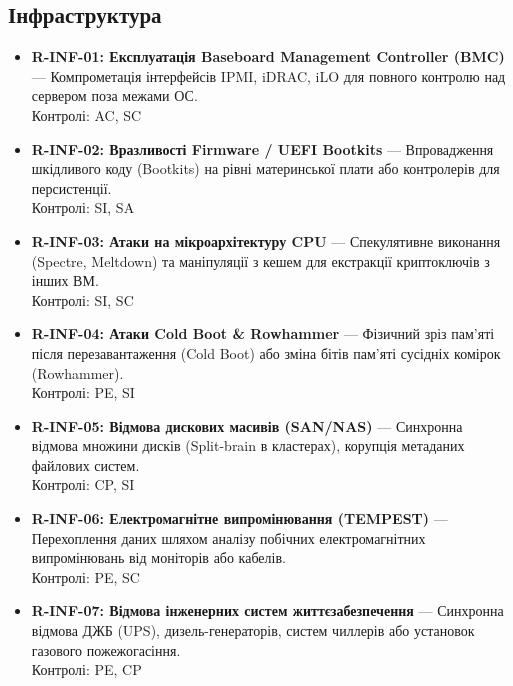 \documentclass{article}
\begin{document}
\subsection{Інфраструктура}
\begin{itemize}
\item \textbf{R-INF-01: Експлуатація Baseboard Management Controller (BMC)} — Компрометація інтерфейсів IPMI, iDRAC, iLO для повного контролю над сервером поза межами ОС.
\\ Контролі: AC, SC
\item \textbf{R-INF-02: Вразливості Firmware / UEFI Bootkits} — Впровадження шкідливого коду (Bootkits) на рівні материнської плати або контролерів для персистенції.
\\ Контролі: SI, SA
\item \textbf{R-INF-03: Атаки на мікроархітектуру CPU} — Спекулятивне виконання (Spectre, Meltdown) та маніпуляції з кешем для екстракції криптоключів з інших ВМ.
\\ Контролі: SI, SC
\item \textbf{R-INF-04: Атаки Cold Boot \& Rowhammer} — Фізичний зріз пам'яті після перезавантаження (Cold Boot) або зміна бітів пам'яті сусідніх комірок (Rowhammer).
\\ Контролі: PE, SI
\item \textbf{R-INF-05: Відмова дискових масивів (SAN/NAS)} — Синхронна відмова множини дисків (Split-brain в кластерах), корупція метаданих файлових систем.
\\ Контролі: CP, SI
\item \textbf{R-INF-06: Електромагнітне випромінювання (TEMPEST)} — Перехоплення даних шляхом аналізу побічних електромагнітних випромінювань від моніторів або кабелів.
\\ Контролі: PE, SC
\item \textbf{R-INF-07: Відмова інженерних систем життєзабезпечення} — Синхронна відмова ДЖБ (UPS), дизель-генераторів, систем чиллерів або установок газового пожежогасіння.
\\ Контролі: PE, CP\end{itemize}
\end{document}

